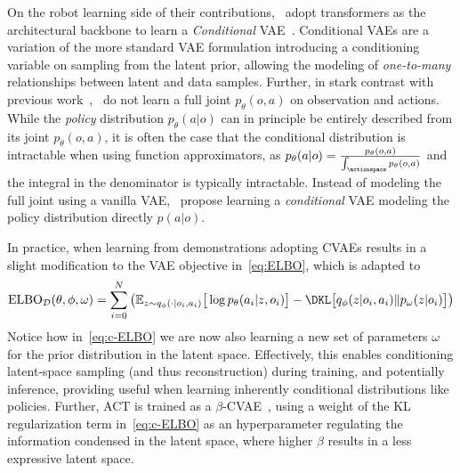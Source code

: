 On the robot learning side of their contributions,~\citet{zhaoLearningFineGrainedBimanual2023} adopt transformers as the architectural backbone to learn a \emph{Conditional} VAE~\citep{sohnLearningStructuredOutput2015}. 
Conditional VAEs are a variation of the more standard VAE formulation introducing a conditioning variable on sampling from the latent prior, allowing the modeling of \emph{one-to-many} relationships between latent and data samples.
Further, in stark contrast with previous work~\citep{florenceImplicitBehavioralCloning2022,jannerPlanningDiffusionFlexible2022},~\citet{zhaoLearningFineGrainedBimanual2023} do not learn a full joint \( p_\theta(o,a) \) on observation and actions.
While the \emph{policy} distribution \( p_\theta(a \vert o) \) can in principle be entirely described from its joint \( p_\theta(o,a) \), it is often the case that the conditional distribution is intractable when using function approximators, as \( p_\theta(a \vert o) = \tfrac{p_\theta(o,a)}{\int_\actionspace p_\theta(o,a)} \) and the integral in the denominator is typically intractable.
Instead of modeling the full joint using a vanilla VAE,~\citet{zhaoLearningFineGrainedBimanual2023} propose learning a \emph{conditional} VAE modeling the policy distribution directly \( p (a \vert o) \).

In practice, when learning from demonstrations adopting CVAEs results in a slight modification to the VAE objective in~\ref{eq:ELBO}, which is adapted to
\begin{align}\label{eq:c-ELBO}
    \text{ELBO}_{\mathcal D}(\theta, \phi, \omega) = \sum_{i=0}^{N} \left(
            \mathbb{E}_{z \sim q_\phi(\cdot \vert o_i, a_i)} \big[ \log p_\theta(a_i \vert z, o_i) \big]
        - \DKL \big[ q_\phi(z \vert o_i, a_i) \Vert p_\omega(z \vert o_i) \big]
        \right)
\end{align}
Notice how in~\ref{eq:c-ELBO} we are now also learning a new set of parameters \( \omega \) for the prior distribution in the latent space.
Effectively, this enables conditioning latent-space sampling (and thus reconstruction) during training, and potentially inference, providing useful when learning inherently conditional distributions like policies.
Further, ACT is trained as a \( \beta\)-CVAE~\citep{higgins2017beta}, using a weight of the KL regularization term in~\ref{eq:c-ELBO} as an hyperparameter regulating the information condensed in the latent space, where higher \( \beta \) results in a less expressive latent space.

